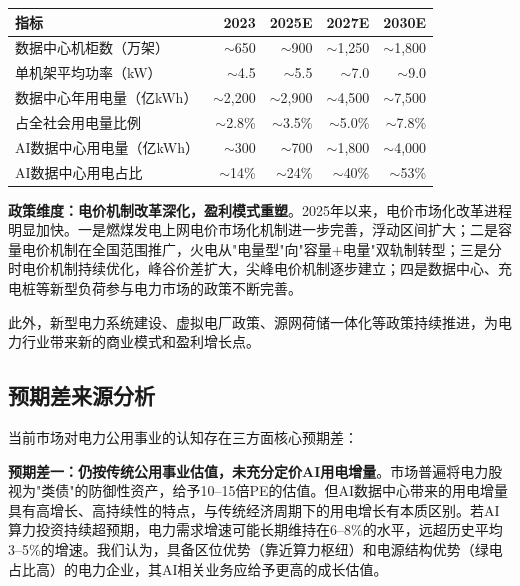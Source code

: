 \begin{exhibitbox}[表4-3：数据中心电力需求增长测算]
\centering
\small
\setlength{\tabcolsep}{6pt}
\begin{tabular}{l r r r r}
\toprule
\textbf{指标} & \textbf{2023} & \textbf{2025E} & \textbf{2027E} & \textbf{2030E} \\
\midrule
数据中心机柜数（万架） & $\sim$650 & $\sim$900 & $\sim$1,250 & $\sim$1,800 \\
单机架平均功率（kW） & $\sim$4.5 & $\sim$5.5 & $\sim$7.0 & $\sim$9.0 \\
数据中心年用电量（亿kWh） & $\sim$2,200 & $\sim$2,900 & $\sim$4,500 & $\sim$7,500 \\
占全社会用电量比例 & $\sim$2.8\% & $\sim$3.5\% & $\sim$5.0\% & $\sim$7.8\% \\
\midrule
AI数据中心用电量（亿kWh） & $\sim$300 & $\sim$700 & $\sim$1,800 & $\sim$4,000 \\
AI数据中心用电占比 & $\sim$14\% & $\sim$24\% & $\sim$40\% & $\sim$53\% \\
\bottomrule
\end{tabular}
\end{exhibitbox}

\vspace{0.3em}

\textbf{政策维度：电价机制改革深化，盈利模式重塑}。2025年以来，电价市场化改革进程明显加快。一是燃煤发电上网电价市场化机制进一步完善，浮动区间扩大；二是容量电价机制在全国范围推广，火电从"电量型"向"容量+电量"双轨制转型；三是分时电价机制持续优化，峰谷价差扩大，尖峰电价机制逐步建立；四是数据中心、充电桩等新型负荷参与电力市场的政策不断完善。

此外，新型电力系统建设、虚拟电厂政策、源网荷储一体化等政策持续推进，为电力行业带来新的商业模式和盈利增长点。

\subsection{预期差来源分析}

当前市场对电力公用事业的认知存在三方面核心预期差：

\vspace{0.3em}

\textbf{预期差一：仍按传统公用事业估值，未充分定价AI用电增量}。市场普遍将电力股视为"类债"的防御性资产，给予10--15倍PE的估值。但AI数据中心带来的用电增量具有高增长、高持续性的特点，与传统经济周期下的用电增长有本质区别。若AI算力投资持续超预期，电力需求增速可能长期维持在6--8\%的水平，远超历史平均3--5\%的增速。我们认为，具备区位优势（靠近算力枢纽）和电源结构优势（绿电占比高）的电力企业，其AI相关业务应给予更高的成长估值。

